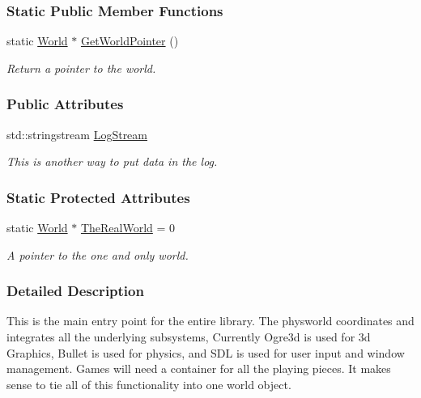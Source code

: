 \subsubsection*{Static Public Member Functions}
\begin{DoxyCompactItemize}
\item 
static \hyperlink{classphys_1_1World}{World} $\ast$ \hyperlink{classphys_1_1World_ac7b8470a75353497bf8f85a8d3cd24e4}{GetWorldPointer} ()
\begin{DoxyCompactList}\small\item\em Return a pointer to the world. \item\end{DoxyCompactList}\end{DoxyCompactItemize}
\subsubsection*{Public Attributes}
\begin{DoxyCompactItemize}
\item 
std::stringstream \hyperlink{classphys_1_1World_a6d8b325a077afc924afb70c259ec0299}{LogStream}
\begin{DoxyCompactList}\small\item\em This is another way to put data in the log. \item\end{DoxyCompactList}\end{DoxyCompactItemize}
\subsubsection*{Static Protected Attributes}
\begin{DoxyCompactItemize}
\item 
\hypertarget{classphys_1_1World_a78f9e764aa85ac44d6f7fa7158377757}{
static \hyperlink{classphys_1_1World}{World} $\ast$ \hyperlink{classphys_1_1World_a78f9e764aa85ac44d6f7fa7158377757}{TheRealWorld} = 0}
\label{classphys_1_1World_a78f9e764aa85ac44d6f7fa7158377757}

\begin{DoxyCompactList}\small\item\em A pointer to the one and only world. \item\end{DoxyCompactList}\end{DoxyCompactItemize}


\subsubsection{Detailed Description}
This is the main entry point for the entire library. The physworld coordinates and integrates all the underlying subsystems, Currently Ogre3d is used for 3d Graphics, Bullet is used for physics, and SDL is used for user input and window management. Games will need a container for all the playing pieces. It makes sense to tie all of this functionality into one world object. 

